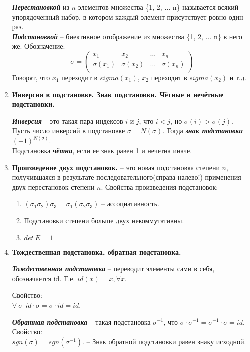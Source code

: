 \begin{enumerate}
	\textit{\textbf{Перестановкой}} из $n$ элементов множества \{1, 2, $\ldots$ n\} называется всякий упорядоченный набор, в котором каждый элемент присутствует ровно один раз.\\
	\textit{\textbf{Подстановкой}} -- биективное отображение из множества \{1, 2, $\ldots$ n\} в него же. Обозначение:
	\[ \sigma = 
	\begin{pmatrix}
	x_1 & x_2 & \ldots & x_n \\
	\sigma(x_1) & \sigma(x_2) & \ldots & \sigma(x_n) \\
	\end{pmatrix}
	\]
	Говорят, что $x_1$ переходит в $sigma(x_1)$, $x_2$ переходит в $sigma(x_2)$ и т.д.
	
	\item \textbf{Инверсия в подстановке. Знак подстановки. Чётные и нечётные подстановки.}
	
	\textit{\textbf{Инверсия}} -- это такая пара индексов $i$ и $j$, что $i<j$, но $\sigma(i) > \sigma(j)$.\\
	Пусть число инверсий в подстановке $\sigma = N(\sigma)$. Тогда \textit{\textbf{знак подстановки}} $(-1)^{N(\sigma)}$. \\
	Подстановка \textit{\textbf{чётна}}, если ее знак равен 1 и нечетна иначе.
	
	\item \textbf{Произведение двух подстановок.} -- 
	это новая подстановка степени $n$, получившаяся в результате последовательного(справа налево!) применения двух перестановок степени $n$.
	Свойства произведения подстановок: 
	\begin{enumerate}
		\item $(\sigma_1 \sigma_2) \sigma_3 = \sigma_1 (\sigma_2 \sigma_3)$ -- ассоциативность.
		\item Подстановки степени больше двух некоммутативны.
		\item $det\ E = 1$
	\end{enumerate}
		
	\item \textbf{Тождественная подстановка, обратная подстановка.}
	
	\textit{\textbf{Тождественная подстановка}} -- переводит элементы сами в себя, обозначается id. Т.е. $id(x) = x, \forall x$.
	
	Свойство:\\
	$\forall\ \sigma\ \  id \cdot \sigma = \sigma \cdot id = id$. 
	
	\textit{\textbf{Обратная подстановка}} -- такая подстановка $\sigma^{-1}$, что $\sigma \cdot \sigma^{-1} = \sigma^{-1} \cdot \sigma = id.$ \\
	Свойство:\\
	$sgn(\sigma) = sgn(\sigma^{-1}).$ -- Знак обратной подстановки равен знаку исходной.
	

\end{enumerate}
